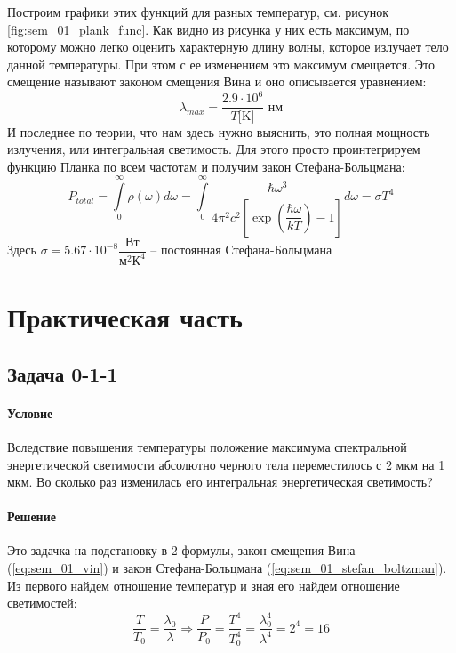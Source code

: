 \documentclass[12pt]{article}
\begin{document}
Построим графики этих функций для разных температур, см. рисунок \ref{fig:sem_01_plank_func}. Как видно из рисунка у них есть максимум, по которому можно легко оценить характерную длину волны, которое излучает тело данной температуры. При этом с ее изменением это максимум смещается. Это смещение называют законом смещения Вина и оно описывается уравнением:
\begin{equation}
\label{eq:sem_01_vin}
    \lambda_{max} = \dfrac{2.9 \cdot 10^6}{T \text{[K]}} \text{ нм}
\end{equation}
И последнее по теории, что нам здесь нужно выяснить, это полная мощность излучения, или интегральная светимость. Для этого просто проинтегрируем функцию Планка по всем частотам и получим закон Стефана-Больцмана:
\begin{equation}
\label{eq:sem_01_stefan_boltzman}
    P_{total} =\int\limits_{0}^{\infty}\rho(\omega)d\omega = \int\limits_{0}^{\infty}\dfrac{\hbar \omega^3}{4\pi^2c^2\left[ \exp{\left(\dfrac{\hbar \omega}{kT}\right)} - 1\right]}d\omega = \sigma T^4
\end{equation}
Здесь $\sigma = 5.67 \cdot 10^{-8} \dfrac{\text{Вт}}{\text{м}^2 \text{К}^4}$ -- постоянная Стефана-Больцмана

\section{Практическая часть}
\subsection{Задача 0-1-1}
\label{task_011}
\paragraph{Условие}
Вследствие повышения температуры положение максимума спектральной  энергетической  светимости  абсолютно  черного  тела  переместилось  с  2 мкм на 1 мкм. Во сколько раз изменилась его интегральная энергетическая светимость?
\paragraph{Решение}
Это задачка на подстановку в 2 формулы, закон смещения Вина (\ref{eq:sem_01_vin}) и закон Стефана-Больцмана (\ref{eq:sem_01_stefan_boltzman}). Из первого найдем отношение температур и зная его найдем отношение светимостей: 
\begin{equation*}
    \dfrac{T}{T_0} = \dfrac{\lambda_0}{\lambda} \Rightarrow \dfrac{P}{P_0} = \dfrac{T^4}{T^4_0} = \dfrac{\lambda^4_0}{\lambda^4} = 2^4 =16 
\end{equation*}
\end{document}
